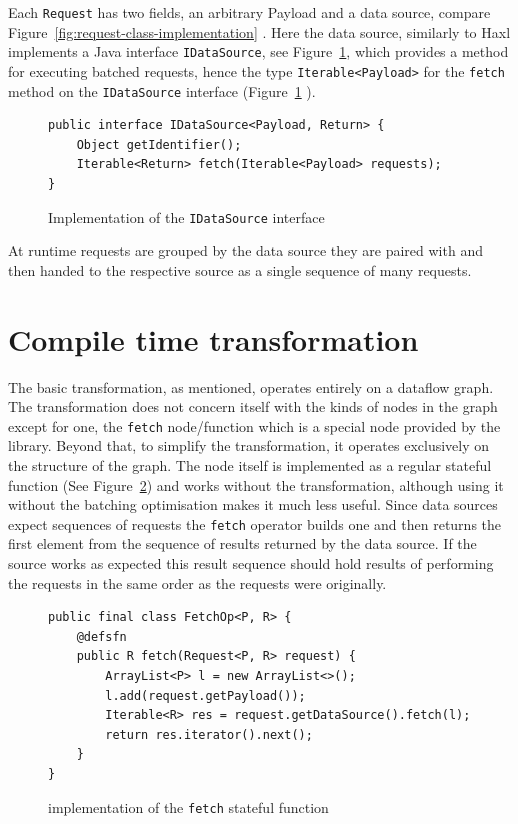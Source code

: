 Each \texttt{Request} has two fields, an arbitrary Payload and a data source, compare Figure~\ref{fig:request-class-implementation} .
Here the data source, similarly to Haxl implements a Java interface \texttt{IDataSource}, see Figure~\ref{fig:idatasource-interface-implementation}, which provides a method for executing batched requests, hence the type \texttt{Iterable<Payload>} for the \texttt{fetch} method on the \texttt{IDataSource} interface (Figure~\ref{fig:idatasource-interface-implementation}   ).

\begin{figure}[h]
\begin{verbatim}
public interface IDataSource<Payload, Return> {
    Object getIdentifier();
    Iterable<Return> fetch(Iterable<Payload> requests);
}
\end{verbatim}
\caption{Implementation of the \texttt{IDataSource} interface}
\label{fig:idatasource-interface-implementation}
\end{figure}

At runtime requests are grouped by the data source they are paired with and then handed to the respective source as a single sequence of many requests.

\section{Compile time transformation}

The basic \yauhau{} transformation, as mentioned, operates entirely on a dataflow graph.
The transformation does not concern itself with the kinds of nodes in the graph except for one, the \texttt{fetch} node/function which is a special node provided by the \yauhau{} library.
Beyond that, to simplify the transformation, it operates exclusively on the structure of the graph.
The \fetch{} node itself is implemented as a regular stateful function (See Figure~\ref{fig:fetch-implementation}) and works without the \yauhau{} transformation, although using it without the batching optimisation makes it much less useful.
Since data sources expect sequences of requests the \texttt{fetch} operator builds one and then returns the first element from the sequence of results returned by the data source.
If the source works as expected this result sequence should hold results of performing the requests in the same order as the requests were originally.

\begin{figure}[h]
\begin{verbatim}
public final class FetchOp<P, R> {
    @defsfn
    public R fetch(Request<P, R> request) {
        ArrayList<P> l = new ArrayList<>();
        l.add(request.getPayload());
        Iterable<R> res = request.getDataSource().fetch(l);
        return res.iterator().next();
    }
}
\end{verbatim}
\caption{implementation of the \texttt{fetch} stateful function}
\label{fig:fetch-implementation}
\end{figure}

